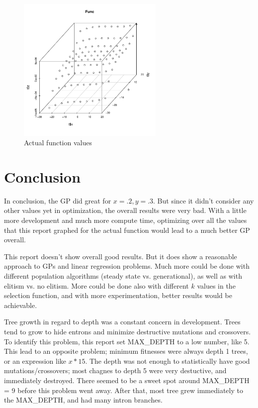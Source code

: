 \documentclass[12pt]{article}
\begin{document}


\begin{figure}[!h]
        \begin{center}
		\includegraphics[width=70mm]{func.pdf}
               \caption{Actual function values}
                \label{results}
        \end{center}
\end{figure}



\part{Conclusion}
In conclusion, the GP did great for $x = .2, y = .3$. But since it didn't consider any other values yet in optimization, the overall results were very bad. With a little more development and much more compute time, optimizing over all the values that this report graphed for the actual function would lead to a much better GP overall.

This report doesn't show overall good results. But it does show a reasonable approach to GPs and linear regression problems. Much more could be done with different population algorithms (steady state vs. generational), as well as with elitism vs. no elitism. More could be done also with different $k$ values in the selection function, and with more experimentation, better results would be achievable.

Tree growth in regard to depth was a constant concern in development. Trees tend to grow to hide entrons and minimize destructive mutations and crossovers\cite{growth}. To identify this problem, this report set MAX\_DEPTH to a low number, like 5. This lead to an opposite problem; minimum fitnesses were always depth 1 trees, or an expression like $ x * 15 $. The depth was not enough to statistically have good mutations/crossovers; most chagnes to depth 5 were very destuctive, and immediately destroyed. There seemed to be a sweet spot around MAX\_DEPTH = 9 before this problem went away. After that, most tree grew immediately to the MAX\_DEPTH, and had many intron branches.
\end{document}
